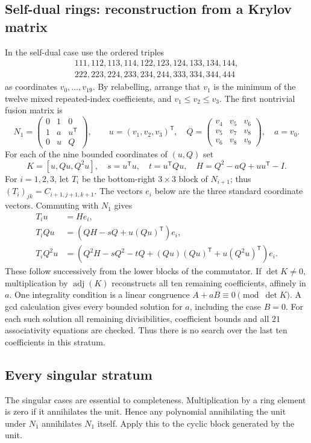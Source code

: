 \subsection{Self-dual rings: reconstruction from a Krylov matrix}
In the self-dual case use the ordered triples
\[
\begin{gathered}111,112,113,114,122,123,124,133,134,144,\\
222,223,224,233,234,244,333,334,344,444\end{gathered}
\]
as coordinates $v_0,\ldots,v_{19}$. By relabelling, arrange that
$v_1$ is the minimum of the twelve mixed repeated-index coefficients,
and $v_1\leq v_2\leq v_3$. The first nontrivial fusion matrix is
\[
N_1=\begin{pmatrix}0&1&0\\1&a&u^{\mathsf T}\\0&u&Q\end{pmatrix},\qquad
u=(v_1,v_2,v_3)^{\mathsf T},\quad
Q=\begin{pmatrix}v_4&v_5&v_6\\v_5&v_7&v_8\\v_6&v_8&v_9\end{pmatrix},
\quad a=v_0.
\]
For each of the nine bounded coordinates of $(u,Q)$ set
\[
K=[u,Qu,Q^2u],\quad s=u^{\mathsf T}u,\quad t=u^{\mathsf T}Qu,
\quad H=Q^2-aQ+uu^{\mathsf T}-I.
\]
For $i=1,2,3$, let $T_i$ be the bottom-right $3\times3$ block
of $N_{i+1}$; thus $(T_i)_{jk}=C_{i+1,j+1,k+1}$.
The vectors $e_i$ below are the three standard coordinate vectors.
Commuting with $N_1$ gives
\begin{align}
T_i u&=He_i,\label{eq:krylov}\\
T_i Qu&=(QH-sQ+u(Qu)^{\mathsf T})e_i,\nonumber\\
T_i Q^2u&=(Q^2H-sQ^2-tQ+(Qu)(Qu)^{\mathsf T}
                       +u(Q^2u)^{\mathsf T})e_i.\nonumber
\end{align}
These follow successively from the lower blocks of the commutator.
If $\det K\ne0$, multiplication by $\operatorname{adj}(K)$ reconstructs
all ten remaining coefficients, affinely in $a$. One integrality
condition is a linear congruence $A+aB\equiv0\pmod{\det K}$.
A gcd calculation gives every bounded solution for $a$, including the
case $B=0$. For each such solution all remaining divisibilities,
coefficient bounds and all $21$ associativity equations are checked.
Thus there is no search over the last ten coefficients in this stratum.

\subsection{Every singular stratum}
The singular cases are essential to completeness. Multiplication by a
ring element is zero if it annihilates the unit. Hence any polynomial
annihilating the unit under $N_1$ annihilates $N_1$ itself. Apply this to
the cyclic block generated by the unit.

